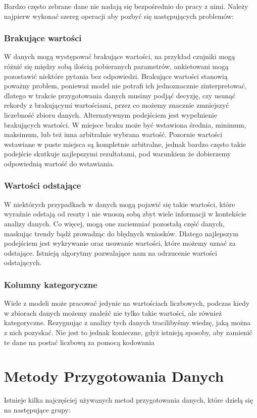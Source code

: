 \documentclass{article}
\begin{document}
Bardzo często zebrane dane nie nadają się bezpośrednio do pracy z nimi. Należy najpierw wykonać szereg operacji aby pozbyć się następujących problemów:   
\subsubsection{Brakujące wartości}
W danych mogą występować brakujące wartości, na przykład czujniki mogą różnić się między sobą ilością pobieranych parametrów, ankietowani mogą pozostawić niektóre pytania bez odpowiedzi. 
Brakujące wartości stanowią poważny problem, ponieważ model nie potrafi ich jednoznacznie zinterpretować, dlatego w trakcie przygotowania danych musimy podjąć decyzję, czy usunąć rekordy z brakującymi wartościami, 
przez co możemy znacznie zmniejszyć liczebność zbioru danych. Alternatywnym podejściem jest wypełnienie brakujących wartości. W miejsce braku może być wstawiona średnia, minimum, maksimum, lub też inna arbitralnie wybrana wartość. 
Pozornie wartości wstawiane w puste miejsca są kompletnie arbitralne, jednak bardzo często takie podejście skutkuje najlepszymi rezultatami, pod warunkiem że dobierzemy odpowiednią wartość do wstawiania. 
\subsubsection{Wartości odstające}
W niektórych przypadkach w danych mogą pojawić się takie wartości, 
które wyraźnie odstają od reszty i nie wnoszą sobą zbyt wiele informacji w kontekście analizy danych. 
Co więcej, mogą one zaciemniać pozostałą część danych, 
maskując trendy bądź prowadząc do błędnych wniosków. Dlatego najlepszym podejściem jest wykrywanie oraz usuwanie wartości, które możemy uznać za odstające. 
Istnieją algorytmy pozwalające nam na odrzucenie wartości odstających.
\subsubsection{Kolumny kategoryczne}
Wiele z modeli może pracować jedynie na wartościach liczbowych, podczas kiedy w zbiorach danych możemy znaleźć nie tylko takie wartości, ale również kategoryczne. Rezygnując z analizy tych danych tracilibyśmy wiedzę, jaką można z nich pozyskać. Nie jest to jednak konieczne, gdyż istnieją sposoby, aby zamienić te dane na postać liczbową za pomocą kodowania


\section{Metody Przygotowania Danych}
Istnieje kilka najczęściej używanych metod przygotowania danych, które dzielą się na następujące grupy:
\end{document}
